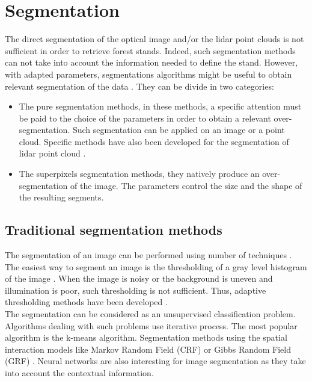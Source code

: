 \section{Segmentation}
\label{sec:C1_seg}
The direct segmentation of the optical image and/or the lidar point clouds is not sufficient in order to retrieve forest stands. Indeed, such segmentation methods can not take into account the information needed to define the stand.  However, with adapted parameters, segmentations algorithms might be useful to obtain relevant segmentation of the data \citep{clement_IJPRS}. They can be divide in two categories:
\begin{itemize}
\item The pure segmentation methods, in these methods, a specific attention must be paid to the choice of the parameters in order to obtain a relevant over-segmentation. Such segmentation can be applied on an image or a point cloud. Specific methods have also been developed for the segmentation of lidar point cloud \citep{nguyen20133d}.
\item The superpixels segmentation methods, they natively produce an over-segmentation of the image. The parameters control the size and the shape of the resulting segments.
\end{itemize}

\subsection{Traditional segmentation methods}
The segmentation of an image can be performed using number of techniques \citep{pal1993review}. \\

The easiest way to segment an image is the thresholding of a gray level histogram of the image \citep{taxt1989segmentation}. When the image is noisy or the background is uneven and illumination is poor, such thresholding is not sufficient. Thus, adaptive thresholding methods have been developed \citep{yanowitz1989new}. \\

The segmentation can be considered as an unsupervised classification problem. Algorithms dealing with such problems use iterative process. The most popular algorithm is the k-means algorithm. Segmentation methods using the spatial interaction models like Markov Random Field (CRF) \citep{hansen1982image} or Gibbs Random Field (GRF) \citep{derin1987modeling}. Neural networks are also interesting for  image segmentation \citep{ghosh1991image} as they take into account the contextual information. \\

